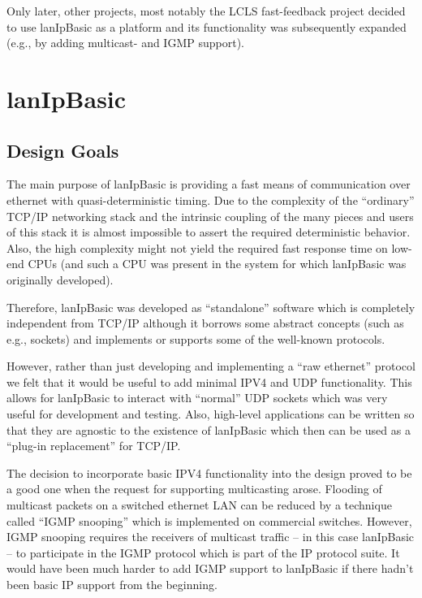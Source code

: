 \documentclass{article}
\newcommand{\lip}{lanIpBasic}
\newcommand{\ethn}{ethernet}
\begin{document}
Only later, other projects, most notably the LCLS fast-feedback project
decided to use \lip{} as a platform and its functionality was subsequently
expanded (e.g., by adding multicast- and IGMP support).

\section{lanIpBasic}
  \subsection{Design Goals}
The main purpose of \lip{} is providing a fast means of
communication over \ethn{} with quasi-deterministic
timing. Due to the complexity of the ``ordinary'' TCP/IP
networking stack and the intrinsic coupling of the many
pieces and users of this stack it is almost impossible
to assert the required deterministic behavior. Also, the
high complexity might not yield the required fast response
time on low-end CPUs (and such a CPU was present in the 
system for which \lip{} was originally developed).

Therefore, \lip{} was developed as ``standalone'' software
which is completely independent from TCP/IP although it
borrows some abstract concepts (such as e.g., sockets) and
implements or supports some of the well-known protocols.

However, rather than just developing and implementing a
``raw ethernet'' protocol we felt that it would be useful
to add minimal IPV4 and UDP functionality. This allows
for \lip{} to interact with ``normal'' UDP sockets which
was very useful for development and testing. Also,
high-level applications can be written so that they
are agnostic to the existence of \lip{} which then
can be used as a ``plug-in replacement'' for TCP/IP.

The decision to incorporate basic IPV4 functionality into
the design proved to be a good one when the request for
supporting multicasting arose. Flooding of multicast
packets on a switched \ethn{} LAN can be reduced by a
technique called ``IGMP snooping'' which is implemented
on commercial switches. However, IGMP snooping requires
the receivers of multicast traffic -- in this case \lip{} --
to participate in the IGMP protocol which is part of
the IP protocol suite. It would have been much harder
to add IGMP support to \lip{} if there hadn't been basic
IP support from the beginning.
\end{document}
